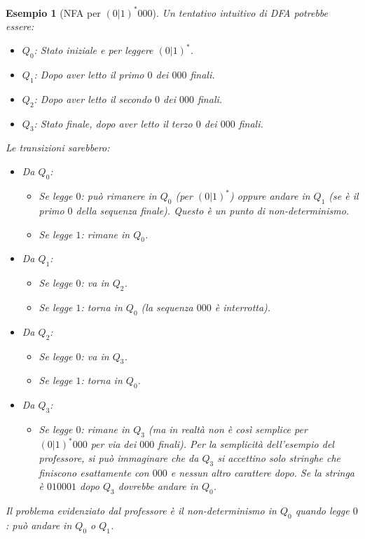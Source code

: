 \documentclass[a4paper, 11pt]{book} %
\newtheorem{example}[theorem]{Esempio}
\theoremstyle{definition}
\begin{document}
\begin{example}[NFA per $(0|1)^*000$]
Un tentativo intuitivo di DFA potrebbe essere:
\begin{itemize}
    \item $Q_0$: Stato iniziale e per leggere $(0|1)^*$.
    \item $Q_1$: Dopo aver letto il primo $0$ dei $000$ finali.
    \item $Q_2$: Dopo aver letto il secondo $0$ dei $000$ finali.
    \item $Q_3$: Stato finale, dopo aver letto il terzo $0$ dei $000$ finali.
\end{itemize}
Le transizioni sarebbero:
\begin{itemize}
    \item Da $Q_0$:
        \begin{itemize}
            \item Se legge $0$: può rimanere in $Q_0$ (per $(0|1)^*$) \emph{oppure} andare in $Q_1$ (se è il primo $0$ della sequenza finale). Questo è un punto di non-determinismo.
            \item Se legge $1$: rimane in $Q_0$.
        \end{itemize}
    \item Da $Q_1$:
        \begin{itemize}
            \item Se legge $0$: va in $Q_2$.
            \item Se legge $1$: torna in $Q_0$ (la sequenza $000$ è interrotta).
        \end{itemize}
    \item Da $Q_2$:
        \begin{itemize}
            \item Se legge $0$: va in $Q_3$.
            \item Se legge $1$: torna in $Q_0$.
        \end{itemize}
    \item Da $Q_3$:
        \begin{itemize}
            \item Se legge $0$: rimane in $Q_3$ (ma in realtà non è così semplice per $(0|1)^*000$ per via dei $000$ finali). Per la semplicità dell'esempio del professore, si può immaginare che da $Q_3$ si accettino solo stringhe che finiscono esattamente con $000$ e nessun altro carattere dopo. Se la stringa è $010001$ dopo $Q_3$ dovrebbe andare in $Q_0$.
        \end{itemize}
\end{itemize}
Il problema evidenziato dal professore è il \emph{non-determinismo} in $Q_0$ quando legge $0$: può andare in $Q_0$ o $Q_1$.
\end{example}
\end{document}
